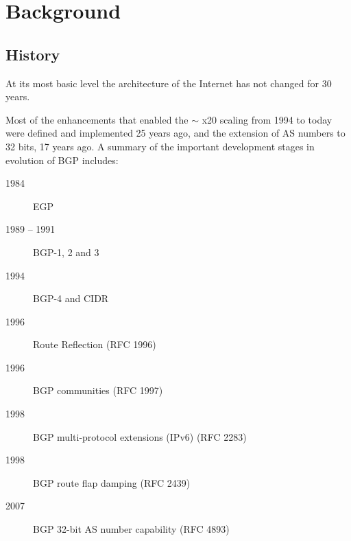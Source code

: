 \chapter{Background}
\section{History}
At its most basic level the architecture of the Internet has not changed for 30 years.







Most of the enhancements that enabled the $\sim$ x20 scaling from 1994 to today were defined and implemented 25 years ago, and the extension of AS numbers to 32 bits, 17 years ago.
A summary of the important development stages in evolution of BGP includes:

\begin{description}
	\item [1984] EGP
	\item [1989 – 1991] BGP-1, 2 and 3
	\item [1994] BGP-4 and CIDR
	\item [1996] Route Reflection (RFC 1996)
	\item [1996] BGP communities (RFC 1997)
	\item [1998] BGP multi-protocol extensions (IPv6) (RFC 2283)
	\item [1998] BGP route flap damping (RFC 2439)
	\item [2007] BGP 32-bit AS number capability (RFC 4893)
\end{description}


